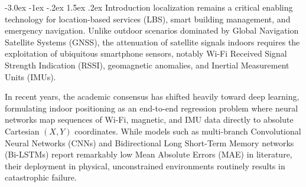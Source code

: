 \documentclass[journal,twoside,compsoc]{IEEEtran}
\makeatletter
\renewcommand{\section}{\@startsection{section}{1}{\z@}%
                       {-3.0ex \@plus -1ex \@minus -.2ex}%
                       {1.5ex \@plus.2ex}%
                       {\normalfont\large\bfseries\sffamily\color{accessblue}}}
\makeatother
\begin{document}
\maketitle
\IEEEdisplaynontitleabstractindextext

\section{Introduction}
 localization remains a critical enabling technology for location-based services (LBS), smart building management, and emergency navigation. Unlike outdoor scenarios dominated by Global Navigation Satellite Systems (GNSS), the attenuation of satellite signals indoors requires the exploitation of ubiquitous smartphone sensors, notably Wi-Fi Received Signal Strength Indication (RSSI), geomagnetic anomalies, and Inertial Measurement Units (IMUs). 

In recent years, the academic consensus has shifted heavily toward deep learning, formulating indoor positioning as an end-to-end regression problem where neural networks map sequences of Wi-Fi, magnetic, and IMU data directly to absolute Cartesian $(X,Y)$ coordinates. While models such as multi-branch Convolutional Neural Networks (CNNs) and Bidirectional Long Short-Term Memory networks (Bi-LSTMs) report remarkably low Mean Absolute Errors (MAE) in literature, their deployment in physical, unconstrained environments routinely results in catastrophic failure. 
\end{document}
